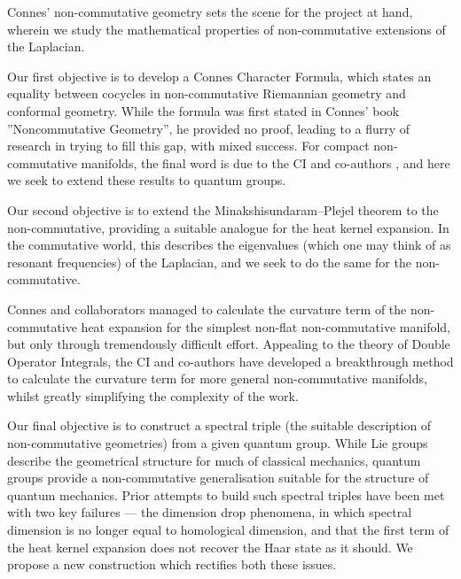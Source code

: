 \documentclass[12pt]{article}
\begin{document}
Connes' non-commutative geometry sets the scene for the project at hand, wherein we study the mathematical properties of non-commutative extensions of the Laplacian.

Our first objective is to develop a Connes Character Formula, which states
an equality between cocycles in non-commutative Riemannian geometry and
conformal geometry. While the formula was first stated in Connes' book ''Noncommutative Geometry'', he provided no proof, leading to a flurry of research in trying to fill this gap, with mixed success. For compact non-commutative manifolds, the final word is due to the CI and co-authors \cite{CRSZ}, and here we seek to extend these results to quantum
groups.


Our second objective is to extend the Minakshisundaram--Plejel theorem to the
non-commutative, providing a suitable analogue for the heat kernel expansion. In the commutative world, this describes the eigenvalues (which one may think of as resonant frequencies) of the Laplacian, and we seek to do the same for the non-commutative. 

Connes and collaborators managed to calculate the curvature term of the non-commutative heat expansion for the simplest non-flat non-commutative manifold, but only through tremendously difficult effort. Appealing to the theory of Double Operator Integrals, the CI and co-authors have developed a breakthrough method to calculate the curvature term for more general non-commutative manifolds, whilst greatly simplifying the complexity of the work.

Our final objective is to construct a spectral triple (the suitable description of non-commutative geometries) from a given quantum group. While Lie groups describe the geometrical structure for much of classical mechanics, quantum groups provide a non-commutative generalisation suitable for the structure of quantum mechanics.
Prior attempts to build such spectral triples have been met with two key failures
--- the dimension drop phenomena, in which spectral dimension is no longer equal
to homological dimension, and that the first term of the heat kernel expansion does not recover the Haar state as it should. We propose a new construction which rectifies both these issues.
\end{document}
